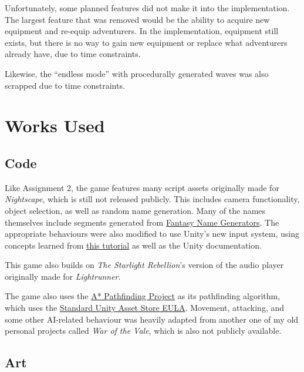 \documentclass[10pt]{article}
\begin{document}
Unfortunately, some planned features did not make it into the implementation. The largest feature that was removed would be the ability
to acquire new equipment and re-equip adventurers. In the implementation, equipment still exists, but there is no way to gain new equipment
or replace what adventurers already have, due to time constraints.

Likewise, the ``endless mode'' with procedurally generated waves was also scrapped due to time constraints.

\section{Works Used}


\subsection{Code}

Like Assignment 2, the game features many script assets originally made for \textit{Nightscape},
which is still not released publicly. This includes camera functionality, object selection, as well as
random name generation. Many of the names themselves include segments generated from
\href{https://www.fantasynamegenerators.com/}{Fantasy Name Generators}.
The appropriate behaviours were also modified to use Unity's new input system, using concepts learned
from \href{https://www.youtube.com/watch?v=PsAbHoB85hM}{this tutorial} as well as the Unity documentation.

This game also builds on \textit{The Starlight Rebellion}'s version of the audio player originally made
for \textit{Lightrunner}.

The game also uses the \href{https://arongranberg.com/astar/}{A* Pathfinding Project} as its pathfinding algorithm,
which uses the \href{https://unity3d.com/legal/as_terms}{Standard Unity Asset Store EULA}. Movement, attacking,
and some other AI-related behaviour was heavily adapted from another one of my old personal projects called \textit{War of the Vale},
which is also not publicly available.

\subsection{Art}
\end{document}
